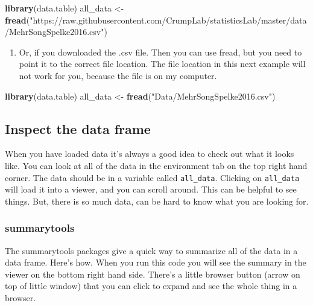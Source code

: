 \documentclass[]{book}
\newenvironment{Shaded}{\begin{snugshade}}{\end{snugshade}}
\newcommand{\KeywordTok}[1]{\textcolor[rgb]{0.13,0.29,0.53}{\textbf{{#1}}}}
\newcommand{\StringTok}[1]{\textcolor[rgb]{0.31,0.60,0.02}{{#1}}}
\newcommand{\NormalTok}[1]{{#1}}
\providecommand{\tightlist}{%
  \setlength{\itemsep}{0pt}\setlength{\parskip}{0pt}}
\theoremstyle{definition}
\theoremstyle{definition}
\theoremstyle{definition}
\theoremstyle{remark}
\begin{document}
\begin{Shaded}
\begin{Highlighting}[]
\KeywordTok{library}\NormalTok{(data.table)}
\NormalTok{all_data <-}\StringTok{ }\KeywordTok{fread}\NormalTok{(}\StringTok{"https://raw.githubusercontent.com/CrumpLab/statisticsLab/master/data/MehrSongSpelke2016.csv"}\NormalTok{)}
\end{Highlighting}
\end{Shaded}

\begin{enumerate}
\def\labelenumi{\arabic{enumi}.}
\setcounter{enumi}{1}
\tightlist
\item
  Or, if you downloaded the .csv file. Then you can use fread, but you
  need to point it to the correct file location. The file location in
  this next example will not work for you, because the file is on my
  computer.
\end{enumerate}

\begin{Shaded}
\begin{Highlighting}[]
\KeywordTok{library}\NormalTok{(data.table)}
\NormalTok{all_data <-}\StringTok{ }\KeywordTok{fread}\NormalTok{(}\StringTok{"Data/MehrSongSpelke2016.csv"}\NormalTok{)}
\end{Highlighting}
\end{Shaded}

\subsection{Inspect the data frame}\label{inspect-the-data-frame}

When you have loaded data it's always a good idea to check out what it
looks like. You can look at all of the data in the environment tab on
the top right hand corner. The data should be in a variable called
\texttt{all\_data}. Clicking on \texttt{all\_data} will load it into a
viewer, and you can scroll around. This can be helpful to see things.
But, there is so much data, can be hard to know what you are looking
for.

\subsubsection{summarytools}\label{summarytools-1}

The summarytools packages give a quick way to summarize all of the data
in a data frame. Here's how. When you run this code you will see the
summary in the viewer on the bottom right hand side. There's a little
browser button (arrow on top of little window) that you can click to
expand and see the whole thing in a browser.
\end{document}
